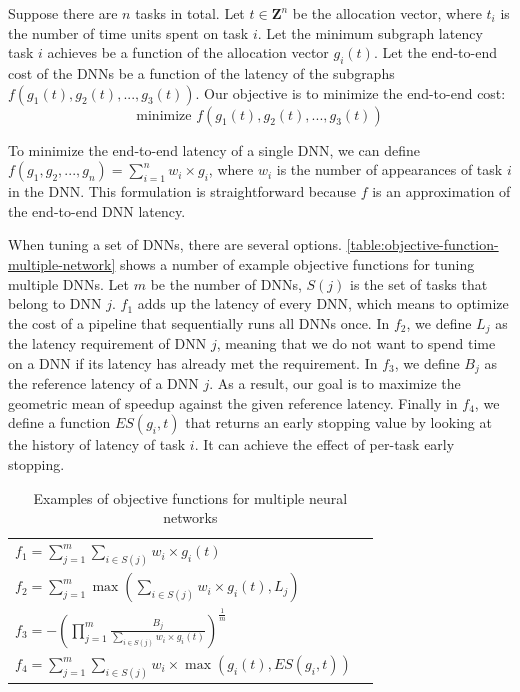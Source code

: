 Suppose there are $n$ tasks in total. Let $t \in \mathbf{Z}^n$ be the allocation vector, where $t_i$ is the number of time units spent on task $i$. Let the minimum subgraph latency task $i$ achieves be a function of the allocation vector $g_i(t)$. Let the end-to-end cost of the DNNs be a function of the latency of the subgraphs $f(g_1(t), g_2(t), ..., g_3(t))$. Our objective is to minimize the end-to-end cost:
\preeq \preeq
$$ \text{minimize } f(g_1(t), g_2(t), ..., g_3(t)) $$
\posteq

To minimize the end-to-end latency of a single DNN, we can define $f(g_1, g_2, ..., g_n) = \sum_{i=1}^{n} {w_i \times g_i}$,
where $w_i$ is the number of appearances of task $i$ in the DNN. This formulation is straightforward because $f$ is an approximation of the end-to-end DNN latency.

When tuning a set of DNNs, there are several options.
\autoref{table:objective-function-multiple-network} shows a number of example objective functions for tuning multiple DNNs.
Let $m$ be the number of DNNs, $S(j)$ is the set of tasks that belong to DNN $j$.
$f_1$ adds up the latency of every DNN, which means to optimize the cost of a pipeline that sequentially runs all DNNs once.
In $f_2$, we define $L_j$ as the latency requirement of DNN $j$, meaning that we do not want to spend time on a DNN if its latency has already met the requirement.
In $f_3$, we define $B_j$ as the reference latency of a DNN $j$. As a result, our goal is to maximize the geometric mean of speedup against the given reference latency.
Finally in $f_4$, we define a function $ES(g_i, t)$ that returns an early stopping value by looking at the history of latency of task $i$. It can achieve the effect of per-task early stopping.


\begin{table}[t!]
	\renewcommand{\arraystretch}{1.4}
	\centering
	\begin{tabular}{ll}
		\hline
		$f_1 =\sum_{j=1}^{m} \sum_{i \in S(j)} w_i \times g_i(t) $ \\ 
		$f_2 = \sum_{j=1}^{m} { \max( \sum_{i \in S(j)} w_i \times g_i(t), L_j)}$ \\
        $f_3 = -(\prod_{j=1}^{m} { \frac{B_j}{\sum_{i \in S(j)} w_i \times g_i(t)} }) ^ {\frac{1}{m}} $ \\
        $f_4 = \sum_{j=1}^{m} { \sum_{i \in S(j)} w_i \times \max( g_i(t), ES(g_i, t))}$ \\
		\hline
	\end{tabular}
	\caption{Examples of objective functions for multiple neural networks}
\postcap
	\label{table:objective-function-multiple-network}
\end{table}

